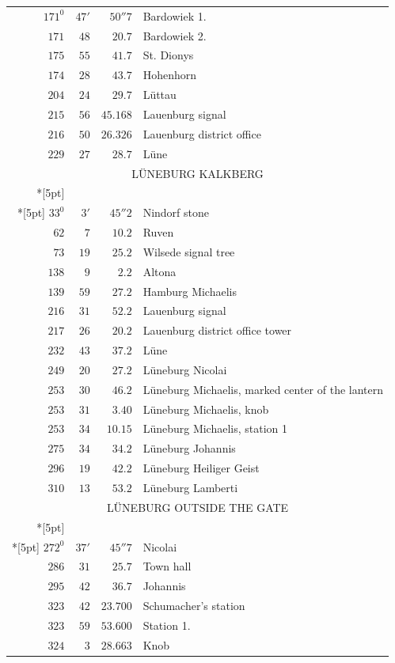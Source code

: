 \clearpage
{}%
\begingroup
\fontsize{10.5}{13}\selectfont
\setlength{\tabcolsep}{3pt}
\setlength{\LTpre}{2pt}
\setlength{\LTpost}{2pt}
\begin{longtable}{@{}rrrp{.61\linewidth}@{}}
\(171^{0}\)&\(47'\)&\(50''7\)&\raggedright Bardowiek 1.\tabularnewline
\(171\)&\(48\)&\(20.7\)&\raggedright Bardowiek 2.\tabularnewline
\(175\)&\(55\)&\(41.7\)&\raggedright St. Dionys\tabularnewline
\(174\)&\(28\)&\(43.7\)&\raggedright Hohenhorn\tabularnewline
\(204\)&\(24\)&\(29.7\)&\raggedright Lüttau\tabularnewline
\(215\)&\(56\)&\(45.168\)&\raggedright Lauenburg signal\tabularnewline
\(216\)&\(50\)&\(26.326\)&\raggedright Lauenburg district office\tabularnewline
\(229\)&\(27\)&\(28.7\)&\raggedright Lüne\tabularnewline
\multicolumn{4}{c}{\strut LÜNEBURG KALKBERG}\\*[5pt]
\multicolumn{4}{c}{\(-191511.038\)\qquad\(-30282.895\)}\\*[5pt]
\(33^{0}\)&\(3'\)&\(45''2\)&\raggedright Nindorf stone\tabularnewline
\(62\)&\(7\)&\(10.2\)&\raggedright Ruven\tabularnewline
\(73\)&\(19\)&\(25.2\)&\raggedright Wilsede signal tree\tabularnewline
\(138\)&\(9\)&\(2.2\)&\raggedright Altona\tabularnewline
\(139\)&\(59\)&\(27.2\)&\raggedright Hamburg Michaelis\tabularnewline
\(216\)&\(31\)&\(52.2\)&\raggedright Lauenburg signal\tabularnewline
\(217\)&\(26\)&\(20.2\)&\raggedright Lauenburg district office tower\tabularnewline
\(232\)&\(43\)&\(37.2\)&\raggedright Lüne\tabularnewline
\(249\)&\(20\)&\(27.2\)&\raggedright Lüneburg Nicolai\tabularnewline
\(253\)&\(30\)&\(46.2\)&\raggedright Lüneburg Michaelis, marked center of the lantern\tabularnewline
\(253\)&\(31\)&\(3.40\)&\raggedright Lüneburg Michaelis, knob\tabularnewline
\(253\)&\(34\)&\(10.15\)&\raggedright Lüneburg Michaelis, station 1\tabularnewline
\(275\)&\(34\)&\(34.2\)&\raggedright Lüneburg Johannis\tabularnewline
\(296\)&\(19\)&\(42.2\)&\raggedright Lüneburg Heiliger Geist\tabularnewline
\(310\)&\(13\)&\(53.2\)&\raggedright Lüneburg Lamberti\tabularnewline
\multicolumn{4}{c}{\strut LÜNEBURG OUTSIDE THE GATE}\\*[5pt]
\multicolumn{4}{c}{\(-191882.273\)\qquad\(-30367.793\)}\\*[5pt]
\(272^{0}\)&\(37'\)&\(45''7\)&\raggedright Nicolai\tabularnewline
\(286\)&\(31\)&\(25.7\)&\raggedright Town hall\tabularnewline
\(295\)&\(42\)&\(36.7\)&\raggedright Johannis\tabularnewline
\(323\)&\(42\)&\(23.700\)&\raggedright Schumacher’s station\tabularnewline
\(323\)&\(59\)&\(53.600\)&\raggedright Station 1.\tabularnewline
\(324\)&\(3\)&\(28.663\)&\raggedright Knob\tabularnewline

\end{longtable}
